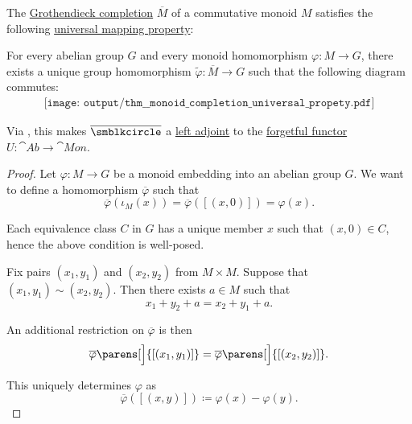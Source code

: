 \begin{proposition}\label{thm:monoid_completion_universal_propety}
  The \hyperref[def:monoid_completion]{Grothendieck completion} \( \overline{M} \) of a commutative monoid \( M \) satisfies the following \hyperref[rem:universal_mapping_property]{universal mapping property}:
  \begin{displayquote}
    For every abelian group \( G \) and every monoid homomorphism \( \varphi: M \to G \), there exists a unique group homomorphism \( \widetilde{\varphi}: \overline{M} \to G \) such that the following diagram commutes:
    \begin{equation}\label{eq:thm:monoid_completion_universal_propety/diagram}
      \begin{aligned}
        \texttt{[image: output/thm\_\_monoid\_completion\_universal\_propety.pdf]}
      \end{aligned}
    \end{equation}
  \end{displayquote}

  Via , this makes \( \overline{\anon} \) a \hyperref[def:category_adjunction]{left adjoint} to the \hyperref[def:concrete_category]{forgetful functor} \( U: \cat{Ab} \to \cat{Mon} \).
\end{proposition}
\begin{proof}
  Let \( \varphi: M \to G \) be a monoid embedding into an abelian group \( G \). We want to define a homomorphism \( \overline{\varphi} \) such that
  \begin{equation*}
    \overline{\varphi}(\iota_M(x)) = \overline{\varphi}([(x, 0)]) = \varphi(x).
  \end{equation*}

  Each equivalence class \( C \) in \( G \) has a unique member \( x \) such that \( (x, 0) \in C \), hence the above condition is well-posed.

  Fix pairs \( (x_1, y_1) \) and \( (x_2, y_2) \) from \( M \times M \). Suppose that \( (x_1, y_1) \sim (x_2, y_2) \). Then there exists \( a \in M \) such that
  \begin{equation*}
    x_1 + y_2 + a = x_2 + y_1 + a.
  \end{equation*}

  An additional restriction on \( \overline{\varphi} \) is then
  \begin{equation*}
    \overline{\varphi}\parens[\Big]{ [(x_1, y_1)] }
    =
    \overline{\varphi}\parens[\Big]{ [(x_2, y_2)] }.
  \end{equation*}

  This uniquely determines \( \varphi \) as
  \begin{equation*}
    \overline{\varphi}([(x, y)]) \coloneqq \varphi(x) - \varphi(y).
  \end{equation*}
\end{proof}

